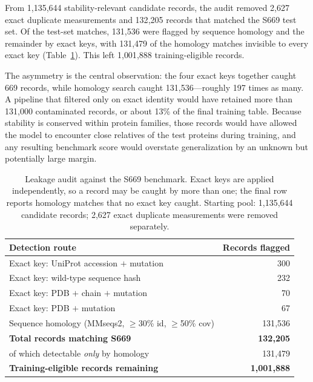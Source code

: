 \documentclass[journal,article,submit,moreauthors]{Definitions/mdpi}
\begin{document}
From 1{,}135{,}644 stability-relevant candidate records, the audit removed 2{,}627 exact
duplicate measurements and 132{,}205 records that matched the S669 test set. Of the
test-set matches, 131{,}536 were flagged by sequence homology and the remainder by exact
keys, with 131{,}479 of the homology matches invisible to every exact key
(Table~\ref{tab:leakage}). This left 1{,}001{,}888 training-eligible records.

The asymmetry is the central observation: the four exact keys together caught 669 records,
while homology search caught 131{,}536---roughly 197 times as many. A pipeline that filtered
only on exact identity would have retained more than 131{,}000 contaminated records, or
about 13\% of the final training table. Because stability is conserved within protein
families, those records would have allowed the model to encounter close relatives of the
test proteins during training, and any resulting benchmark score would overstate
generalization by an unknown but potentially large margin.

\begin{table}[H]
\caption{Leakage audit against the S669 benchmark. Exact keys are applied independently, so
a record may be caught by more than one; the final row reports homology matches that no
exact key caught. Starting pool: 1{,}135{,}644 candidate records; 2{,}627 exact duplicate
measurements were removed separately.}
\label{tab:leakage}
\begin{tabular}{lr}
\toprule
\textbf{Detection route} & \textbf{Records flagged}\\
\midrule
Exact key: UniProt accession $+$ mutation      & 300\\
Exact key: wild-type sequence hash             & 232\\
Exact key: PDB $+$ chain $+$ mutation          & 70\\
Exact key: PDB $+$ mutation                    & 67\\
\midrule
Sequence homology (MMseqs2, $\geq$30\% id, $\geq$50\% cov) & 131{,}536\\
\midrule
\textbf{Total records matching S669}           & \textbf{132{,}205}\\
\quad of which detectable \textit{only} by homology & 131{,}479\\
\midrule
\textbf{Training-eligible records remaining}   & \textbf{1{,}001{,}888}\\
\bottomrule
\end{tabular}
\end{table}
\end{document}
